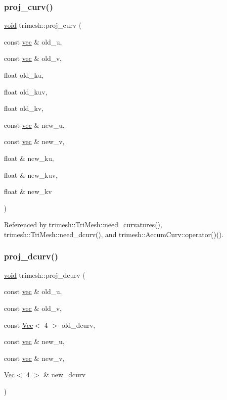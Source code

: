\subsubsection{\texorpdfstring{proj\+\_\+curv()}{proj\_curv()}}
{\footnotesize\ttfamily \hyperlink{namespacetrimesh_a784ddfd979e1c579bda795a8edfc3f43}{void} trimesh\+::proj\+\_\+curv (\begin{DoxyParamCaption}\item[{const \hyperlink{namespacetrimesh_a4fc2b83feba99c931f837a0c7d4b4df1}{vec} \&}]{old\+\_\+u,  }\item[{const \hyperlink{namespacetrimesh_a4fc2b83feba99c931f837a0c7d4b4df1}{vec} \&}]{old\+\_\+v,  }\item[{float}]{old\+\_\+ku,  }\item[{float}]{old\+\_\+kuv,  }\item[{float}]{old\+\_\+kv,  }\item[{const \hyperlink{namespacetrimesh_a4fc2b83feba99c931f837a0c7d4b4df1}{vec} \&}]{new\+\_\+u,  }\item[{const \hyperlink{namespacetrimesh_a4fc2b83feba99c931f837a0c7d4b4df1}{vec} \&}]{new\+\_\+v,  }\item[{float \&}]{new\+\_\+ku,  }\item[{float \&}]{new\+\_\+kuv,  }\item[{float \&}]{new\+\_\+kv }\end{DoxyParamCaption})}



Referenced by trimesh\+::\+Tri\+Mesh\+::need\+\_\+curvatures(), trimesh\+::\+Tri\+Mesh\+::need\+\_\+dcurv(), and trimesh\+::\+Accum\+Curv\+::operator()().

\mbox{\label{namespacetrimesh_a0869493c6351b5ff95889cd7c3a0eb24}} 
\subsubsection{\texorpdfstring{proj\+\_\+dcurv()}{proj\_dcurv()}}
{\footnotesize\ttfamily \hyperlink{namespacetrimesh_a784ddfd979e1c579bda795a8edfc3f43}{void} trimesh\+::proj\+\_\+dcurv (\begin{DoxyParamCaption}\item[{const \hyperlink{namespacetrimesh_a4fc2b83feba99c931f837a0c7d4b4df1}{vec} \&}]{old\+\_\+u,  }\item[{const \hyperlink{namespacetrimesh_a4fc2b83feba99c931f837a0c7d4b4df1}{vec} \&}]{old\+\_\+v,  }\item[{const \hyperlink{classtrimesh_1_1Vec}{Vec}$<$ 4 $>$}]{old\+\_\+dcurv,  }\item[{const \hyperlink{namespacetrimesh_a4fc2b83feba99c931f837a0c7d4b4df1}{vec} \&}]{new\+\_\+u,  }\item[{const \hyperlink{namespacetrimesh_a4fc2b83feba99c931f837a0c7d4b4df1}{vec} \&}]{new\+\_\+v,  }\item[{\hyperlink{classtrimesh_1_1Vec}{Vec}$<$ 4 $>$ \&}]{new\+\_\+dcurv }\end{DoxyParamCaption})}



